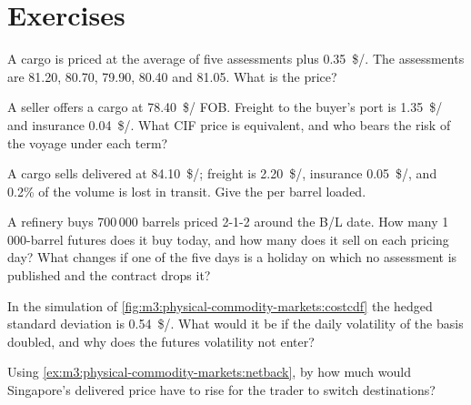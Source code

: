 \section{Exercises}

\begin{exercise}[$\star$]\label{exo:m3:physical-commodity-markets:1}
A cargo is priced at the average of five assessments plus \qty{0.35}{\$/\barrel}.
The assessments are 81.20, 80.70, 79.90, 80.40 and 81.05. What is the price?
\end{exercise}

\begin{exercise}[$\star$]\label{exo:m3:physical-commodity-markets:2}
A seller offers a cargo at \qty{78.40}{\$/\barrel} FOB. Freight to the buyer's port
is \qty{1.35}{\$/\barrel} and insurance \qty{0.04}{\$/\barrel}. What CIF price is
equivalent, and who bears the risk of the voyage under each term?
\end{exercise}

\begin{exercise}[$\star$]\label{exo:m3:physical-commodity-markets:3}
A cargo sells delivered at \qty{84.10}{\$/\barrel}; freight is
\qty{2.20}{\$/\barrel}, insurance \qty{0.05}{\$/\barrel}, and 0.2\% of the volume
is lost in transit. Give the  per barrel loaded.
\end{exercise}

\begin{exercise}[$\star\star$]\label{exo:m3:physical-commodity-markets:4}
A refinery buys 700\,000 barrels priced 2-1-2 around the B/L date. How many
1\,000-barrel futures does it buy today, and how many does it sell on each pricing
day? What changes if one of the five days is a holiday on which no assessment is
published and the contract drops it?
\end{exercise}

\begin{exercise}[$\star\star$]\label{exo:m3:physical-commodity-markets:5}
In the simulation of \cref{fig:m3:physical-commodity-markets:costcdf} the hedged
standard deviation is \qty{0.54}{\$/\barrel}. What would it be if the daily
volatility of the basis doubled, and why does the futures volatility not enter?
\end{exercise}

\begin{exercise}[$\star\star$]\label{exo:m3:physical-commodity-markets:6}
Using \cref{ex:m3:physical-commodity-markets:netback}, by how much would Singapore's
delivered price have to rise for the trader to switch destinations?
\end{exercise}

